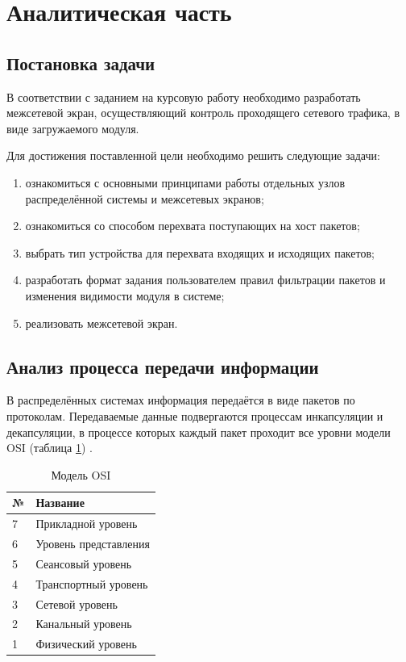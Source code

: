 \section{Аналитическая часть}

\subsection{Постановка задачи}\label{sec:task}
В соответствии с заданием на курсовую работу необходимо разработать межсетевой экран, осуществляющий контроль проходящего сетевого трафика, в виде загружаемого модуля.

Для достижения поставленной цели необходимо решить следующие задачи:
\begin{enumerate}
	\item ознакомиться с основными принципами работы отдельных узлов распределённой системы и межсетевых экранов;
	
	\item ознакомиться со способом перехвата поступающих на хост пакетов;
	
	\item выбрать тип устройства для перехвата входящих и исходящих пакетов;
	
	\item разработать формат задания пользователем правил фильтрации пакетов и изменения видимости модуля в системе;
	
	\item реализовать межсетевой экран. \newline
\end{enumerate}

\subsection{Анализ процесса передачи информации}
В распределённых системах информация передаётся в виде пакетов по протоколам. Передаваемые данные подвергаются процессам инкапсуляции и декапсуляции, в процессе которых каждый пакет проходит все уровни модели OSI (таблица \ref{osi_table}) \cite{net}.

\begin{table}[h]
	\begin{center}
		\caption{Модель OSI}
		\label{osi_table}
		\begin{tabular}{| p{1cm} | p{7cm} |}
			\hline
			\textbf{№} 	& \textbf{Название} \\
			\hline
			7 		& Прикладной уровень\\ 
			\hline
			6 		& Уровень представления  \\ 
			\hline
			5 		& Сеансовый уровень \\ 
			\hline
			4 		& Транспортный уровень \\ 
			\hline
			3 		& Сетевой уровень \\ 
			\hline
			2 		& Канальный уровень \\ 
			\hline
			1 		& Физический уровень \\ 
			\hline
		\end{tabular}
	\end{center}
\end{table} 

